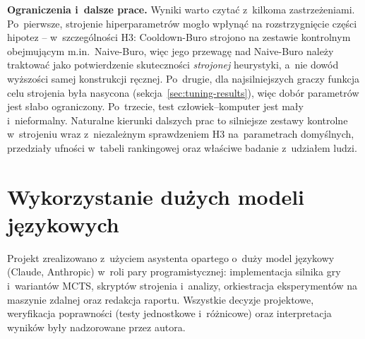 \documentclass[12pt,a4paper]{article}
\begin{document}
\textbf{Ograniczenia i~dalsze prace.} Wyniki warto czytać z~kilkoma zastrzeżeniami. Po~pierwsze,
strojenie hiperparametrów mogło wpłynąć na rozstrzygnięcie części hipotez -- w~szczególności H3:
Cooldown-Buro strojono na zestawie kontrolnym obejmującym m.in.\ Naive-Buro, więc jego przewagę nad
Naive-Buro należy traktować jako potwierdzenie skuteczności \emph{strojonej} heurystyki, a~nie
dowód wyższości samej konstrukcji ręcznej. Po~drugie, dla najsilniejszych graczy funkcja celu
strojenia była nasycona (sekcja~\ref{sec:tuning-results}), więc dobór parametrów jest słabo
ograniczony. Po~trzecie, test człowiek--komputer jest mały i~nieformalny. Naturalne kierunki dalszych
prac to silniejsze zestawy kontrolne w~strojeniu wraz z~niezależnym sprawdzeniem H3 na~parametrach
domyślnych, przedziały ufności w~tabeli rankingowej oraz właściwe badanie z~udziałem ludzi.

\section{Wykorzystanie dużych modeli językowych}
Projekt zrealizowano z~użyciem asystenta opartego o~duży model językowy (Claude, Anthropic) w~roli
pary programistycznej: implementacja silnika gry i~wariantów MCTS, skryptów strojenia i~analizy,
orkiestracja eksperymentów na maszynie zdalnej oraz redakcja raportu. Wszystkie decyzje projektowe,
weryfikacja poprawności (testy jednostkowe i~różnicowe) oraz interpretacja wyników były nadzorowane
przez autora.


\end{document}
